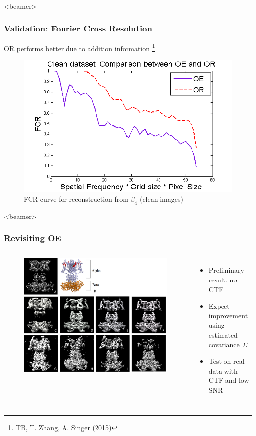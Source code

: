 \documentclass{beamer}
\newcommand\blfootnote[1]{%
  \begingroup
  \renewcommand\thefootnote{}\footnote{#1}%
  \addtocounter{footnote}{-1}%
  \endgroup
}
\begin{document}
\begin{frame}<beamer>
\frametitle{Validation: Fourier Cross Resolution}
OR performs better due to addition information \blfootnote{TB, T. Zhang, A. Singer (2015)}
\begin{figure}[t]
  \centering
  \includegraphics[width=.8\columnwidth]{figures/FSC_final.png}
  \caption{FCR curve for reconstruction from $\beta_4$ (clean images)}\label{fig:fsc}
\end{figure}
\end{frame}


\begin{frame}<beamer>
\frametitle{Revisiting OE}
 \begin{columns}
\begin{figure}[!htbp]
\begin{center}
\includegraphics[width=.95 \columnwidth]{figures/reconstruction_all.png}
\end{center}
\end{figure}
\begin{itemize}
\item Preliminary result: no CTF
\item Expect improvement using estimated covariance $\Sigma$
\item Test on real data with CTF and low SNR
\end{itemize}
\end{columns}
\end{frame}
\end{document}
